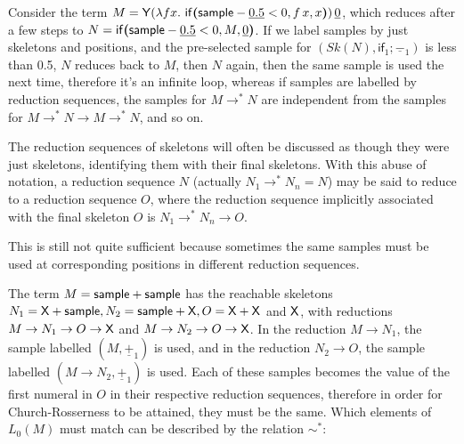 \begin{example} Consider the term $M = \tY (\lambda f x.\ \tif{\tsample - \underline{0.5} < 0}{f \, x}{x}) \, \underline 0$, which reduces after a few steps to $N = \mathsf{if}\boldsymbol{(}\mathsf{sample} - \underline{0.5}  < 0, M, \underline 0\boldsymbol{)}$. If we label samples by just skeletons and positions, and the pre-selected sample for $(\mathit{Sk}(N),\textsf{if}_1;\underline{-}_1)$ is less than 0.5, $N$ reduces back to $M$, then $N$ again, then the same sample is used the next time, therefore it's an infinite loop, whereas if samples are labelled by reduction sequences, the samples for $M \to^\ast N$ are independent from the samples for $M \to^\ast N \to M \to^\ast N$, and so on.
\end{example}

The reduction sequences of skeletons will often be discussed as though they were just skeletons, identifying them with their final skeletons. With this abuse of notation, a reduction sequence $N$ (actually $N_1 \to^\ast N_n = N$) may be said to reduce to a reduction sequence $O$, where the reduction sequence implicitly associated with the final skeleton $O$ is $N_1 \to^\ast N_n \to O$.

\medskip
This is still not quite sufficient because sometimes the same samples must be used at corresponding positions in different reduction sequences. 

\begin{example} \label{ex:cousin sim} 
The term $M = \mathsf{sample} + \mathsf{sample}$ has the reachable skeletons $N_1 = \mathsf{X} + \mathsf{sample}, N_2 = \mathsf{sample} + \mathsf{X}, O = \mathsf{X} + \mathsf{X}$ and $\mathsf{X}$, with reductions $M \to N_1 \to O \to \mathsf{X}$ and $M \to N_2 \to O \to \mathsf{X}$. 
In the reduction $M \to N_1$, the sample labelled $(M, \underline{+}_1)$ is used, and in the reduction $N_2 \to O$, the sample labelled $(M \to N_2, \underline{+}_1)$ is used. 
Each of these samples becomes the value of the first numeral in $O$ in their respective reduction sequences, therefore in order for Church-Rosserness to be attained, they must be the same. Which elements of $L_0(M)$ must match can be described by the relation $\sim^*$:
\end{example}

